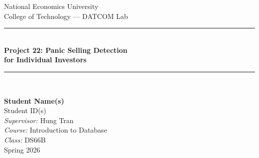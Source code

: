 \documentclass[a4paper,11pt,oneside]{book}
\begin{document}

\frontmatter

\begin{titlepage}
    \begin{center}

        {\LARGE National Economics University\\[0.3cm]
        College of Technology — DATCOM Lab}\\[2cm]

        \rule{\textwidth}{1.5pt}\\[0.5cm]
        \linespread{1.3}
        \huge\textbf{
            Project 22: Panic Selling Detection\\
            for Individual Investors
        }
        \\[0.5cm]
        \rule{\textwidth}{1.5pt}\\[2cm]
        \linespread{1}

        {\Large \textbf{Student Name(s)}}\\[0.5cm]
        {\large Student ID(s)}\\[1cm]

        {\large \emph{Supervisor:} Hung Tran}\\[0.5cm]
        {\large \emph{Course:} Introduction to Database}\\[0.5cm]
        {\large \emph{Class:} DS66B}\\[2cm]

        \vfill
        {\large Spring 2026}
    \end{center}
\end{titlepage}



\tableofcontents
\listoffigures
\listoftables

\mainmatter
\end{document}
